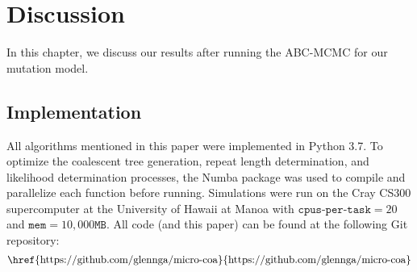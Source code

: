 \chapter{Discussion}\label{ch:discussion}
In this chapter, we discuss our results after running the ABC-MCMC for our mutation model.

\section{Implementation}\label{sec:implementation}
All algorithms mentioned in this paper were implemented in Python 3.7.
To optimize the coalescent tree generation, repeat length determination, and likelihood determination processes, the
Numba package was used to compile and parallelize each function before running.
Simulations were run on the Cray CS300 supercomputer at the University of Hawaii at Manoa with
$\texttt{cpus-per-task} = 20$ and $\texttt{mem}=10,000\texttt{MB}$.
All code (and this paper) can be found at the following Git repository:
\begin{equation*}
    \text{\href{https://github.com/glennga/micro-coa}{https://github.com/glennga/micro-coa}}
\end{equation*}

